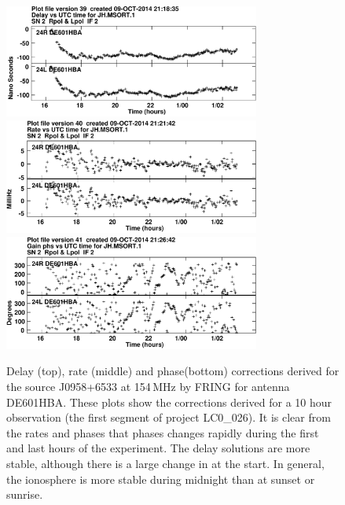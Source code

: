 \documentclass[graybox]{svmult}
\begin{document}
\begin{figure}[htbp]
\begin{center}
\includegraphics[width=0.75\textwidth]{figures/J0958Hdelays-crop.pdf}
\includegraphics[width=0.75\textwidth]{figures/J0958Hrates-crop.pdf}
\includegraphics[width=0.75\textwidth]{figures/J0958Hfringpsol-crop.pdf}
\caption{
Delay (top), rate (middle) and phase(bottom) corrections derived for the source
J0958+6533 at 154\,MHz by FRING for antenna DE601HBA. These plots show the
corrections derived for a 10 hour observation (the first segment of project
LC0\_026). It is clear from the rates and phases that phases changes rapidly
during the first and last hours of the experiment. The delay solutions are more
stable, although there is a large change in at the start. In general, the
ionosphere is more stable during midnight than at sunset or sunrise.  }

\end{center}
\end{figure}

\end{document}
